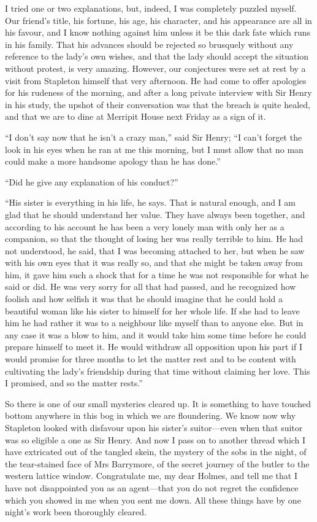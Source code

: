 \documentclass[paper=5.5in:8.5in,BCOR=7mm,twoside,DIV=calc,12pt,usegeometry,openany,chapterprefix,endperiod,headings=big]{scrbook} %
\begin{document}
I tried one or two explanations, but, indeed, I was completely puzzled myself. Our friend's title, his fortune, his age, his character, and his appearance are all in his favour, and I know nothing against him unless it be this dark fate which runs in his family. That his advances should be rejected so brusquely without any reference to the lady's own wishes, and that the lady should accept the situation without protest, is very amazing. However, our conjectures were set at rest by a visit from Stapleton himself that very afternoon. He had come to offer apologies for his rudeness of the morning, and after a long private interview with Sir Henry in his study, the upshot of their conversation was that the breach is quite healed, and that we are to dine at Merripit House next Friday as a sign of it.

\enquote{I don't say now that he isn't a crazy man,} said Sir Henry; \enquote{I can't forget the look in his eyes when he ran at me this morning, but I must allow that no man could make a more handsome apology than he has done.}

\enquote{Did he give any explanation of his conduct?}

\enquote{His sister is everything in his life, he says. That is natural e\-nough, and I am glad that he should understand her value. They have always been together, and according to his account he has been a very lonely man with only her as a companion, so that the thought of losing her was really terrible to him. He had not understood, he said, that I was becoming attached to her, but when he saw with his own eyes that it was really so, and that she might be taken away from him, it gave him such a shock that for a time he was not responsible for what he said or did. He was very sorry for all that had passed, and he recognized how foolish and how selfish it was that he should imagine that he could hold a beautiful woman like his sister to himself for her whole life. If she had to leave him he had rather it was to a neighbour like myself than to anyone else. But in any case it was a blow to him, and it would take him some time before he could prepare himself to meet it. He would withdraw all opposition upon his part if I would promise for three months to let the matter rest and to be content with cultivating the lady's friendship during that time without claiming her love. This I promised, and so the matter rests.}

So there is one of our small mysteries cleared up. It is something to have touched bottom anywhere in this bog in which we are floundering. We know now why Stapleton looked with disfavour upon his sister's suitor---even when that suitor was so eligible a one as Sir Henry. And now I pass on to another thread which I have extricated out of the tangled skein, the mystery of the sobs in the night, of the tear-stained face of Mrs Barrymore, of the secret journey of the butler to the western lattice window. Congratulate me, my dear Holmes, and tell me that I have not disappointed you as an agent---that you do not regret the confidence which you showed in me when you sent me down. All these things have by one night's work been thoroughly cleared.
\end{document}
